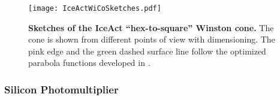 \begin{figure}
	\centering
	\texttt{[image: IceActWiCoSketches.pdf]}
	\caption[Sketches of the IceAct \enquote{hex-to-square} Winston cone]{\textbf{Sketches of the IceAct \enquote{hex-to-square} Winston cone.} The cone is shown from different points of view with dimensioning. The pink edge and the green dashed surface line follow the optimized parabola functions developed in \cite{iceact:camera}.}
	\label{iceact:camera:iceact_wico_sketch}	
\end{figure}

\subsubsection{Silicon Photomultiplier}\label{sec:sipm}


